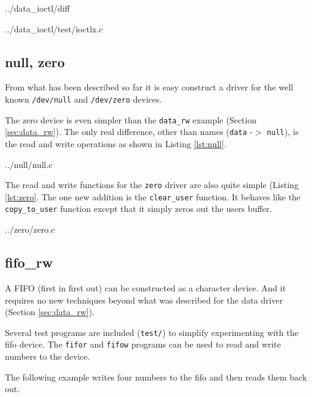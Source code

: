 \documentclass{article}
\begin{document}
\pagebreak

	{../data_ioctl/diff}


	{../data_ioctl/test/ioctlx.c}


\subsection{null, zero}

From what has been described so far it is easy construct a driver
for the well known \verb+/dev/null+ and \verb+/dev/zero+ devices.

The zero device is even simpler than the \verb+data_rw+ example
(Section \ref{sec:data_rw}).
The only real difference, other than names (\verb+data+ -$>$ \verb+null+),
is the read and write operations as shown in Listing \ref{lst:null}.


	{../null/null.c}

The read and write functions for the \verb+zero+ driver are also quite
simple (Listing \ref{lst:zero}.
The one new addition is the \verb+clear_user+ function.
It behaves like the \verb+copy_to_user+ function except that it simply
zeros out the users buffer.


	{../zero/zero.c}


\pagebreak
\subsection{fifo\_rw}
\label{sec:fifo_rw}

A FIFO (first in first out) can be constructed as a character device.
And it requires no new techniques beyond what was described for
the data driver (Section \ref{sec:data_rw}).

Several test programs are included (\verb+test/+) to simplify
experimenting with the fifo device.
The \verb+fifor+ and \verb+fifow+ programs can
be used to read and write numbers to the device.

The following example writes four numbers to the fifo and then
reads them back out.
\end{document}

